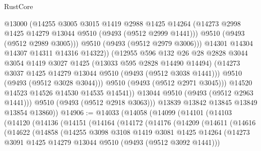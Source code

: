 \begin{lexlean}{RustCore}
\begin{coremodule}
                        @13000
                        (@14255
                          @3005
                          @3015
                          @1419
                          @2988
                          @1425
                          @14264
                          (@14273 @2998 @1425 @14279 @13044 @9510 (@9493 (@9512 @2999 @1441)))
                          @9510
                          (@9493 (@9512 @2989 @3005)))
                        @9510
                        (@9493 (@9512 @2979 @3006)))
                      @14301
                      @14304
                      @14307
                      @14311
                      @14316
                      @14322))
                  (@12955
                    @596
                    @132
                    @26
                    @28
                    @2828
                    @3044
                    @3054
                    @1419
                    @3027
                    @1425
                    (@13033 @595 @2828 @14490 @14494)
                    (@14273 @3037 @1425 @14279 @13044 @9510 (@9493 (@9512 @3038 @1441)))
                    @9510
                    (@9493 (@9512 @3028 @3044)))
                  @9510
                  (@9493 (@9512 @2971 @3045)))
                @14520
                @14523
                @14526
                @14530
                @14535
                @14541))
            @13044
            @9510
            (@9493 (@9512 @2963 @1441)))
          @9510
          (@9493 (@9512 @2918 @3063)))
        @13839
        @13842
        @13845
        @13849
        @13854
        @13860))
@14906 := @14033
    (@14058
      (@14099
        (@14101
          (@14103
            (@14120
              (@14136
                (@14151
                  (@14164
                    (@14172
                      (@14176
                        (@14209
                          (@14611
                            (@14616
                              (@14622
                                (@14858
                                  (@14255
                                    @3098
                                    @3108
                                    @1419
                                    @3081
                                    @1425
                                    @14264
                                    (@14273
                                      @3091
                                      @1425
                                      @14279
                                      @13044
                                      @9510
                                      (@9493 (@9512 @3092 @1441)))

\end{coremodule}
\end{lexlean}
